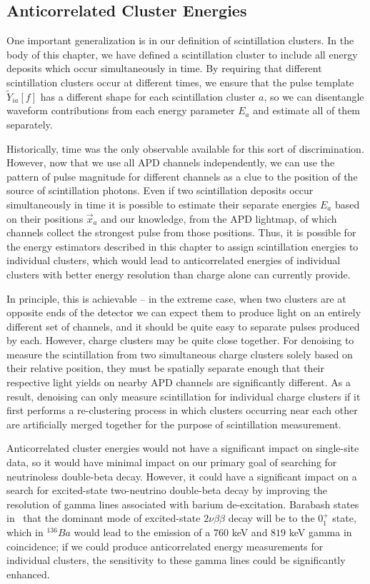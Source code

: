 \subsection{Anticorrelated Cluster Energies}

One important generalization is in our definition of scintillation clusters.  In the body of this chapter, we have defined a scintillation cluster to include all energy deposits which occur simultaneously in time.  By requiring that different scintillation clusters occur at different times, we ensure that the pulse template $\widetilde{Y}_{ia}[f]$ has a different shape for each scintillation cluster $a$, so we can disentangle waveform contributions from each energy parameter $E_a$ and estimate all of them separately.

Historically, time was the only observable available for this sort of discrimination.  However, now that we use all APD channels independently, we can use the pattern of pulse magnitude for different channels as a clue to the position of the source of scintillation photons.  Even if two scintillation deposits occur simultaneously in time it is possible to estimate their separate energies $E_a$ based on their positions $\vec{x}_a$ and our knowledge, from the APD lightmap, of which channels collect the strongest pulse from those positions.  Thus, it is possible for the energy estimators described in this chapter to assign scintillation energies to individual clusters, which would lead to anticorrelated energies of individual clusters with better energy resolution than charge alone can currently provide.

In principle, this is achievable -- in the extreme case, when two clusters are at opposite ends of the detector we can expect them to produce light on an entirely different set of channels, and it should be quite easy to separate pulses produced by each.  However, charge clusters may be quite close together.  For denoising to measure the scintillation from two simultaneous charge clusters solely based on their relative position, they must be spatially separate enough that their respective light yields on nearby APD channels are significantly different.  As a result, denoising can only measure scintillation for individual charge clusters if it first performs a re-clustering process in which clusters occurring near each other are artificially merged together for the purpose of scintillation measurement.

Anticorrelated cluster energies would not have a significant impact on single-site data, so it would have minimal impact on our primary goal of searching for neutrinoless double-beta decay.  However, it could have a significant impact on a search for excited-state two-neutrino double-beta decay by improving the resolution of gamma lines associated with barium de-excitation.  Barabash states in~\cite{Barabash2010} that the dominant mode of excited-state $2\nu \beta\beta$ decay will be to the $0^{+}_1$ state, which in $^{136}Ba$ would lead to the emission of a $760$ keV and $819$ keV gamma in coincidence; if we could produce anticorrelated energy measurements for individual clusters, the sensitivity to these gamma lines could be significantly enhanced.

